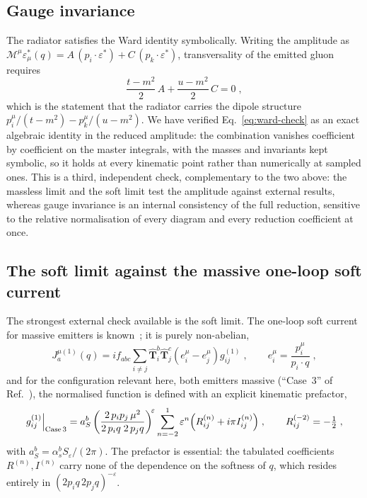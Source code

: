 \documentclass[11pt,a4paper]{article}
\newcommand{\eps}{\varepsilon}
\newcommand{\Top}[1]{\hat{\mathbf{T}}_{#1}}
\begin{document}
\subsection{Gauge invariance}
\label{sec:ward}
The radiator satisfies the Ward identity symbolically. Writing the amplitude as
$\mathcal{M}^\mu\eps^*_\mu(q)=A\,(p_i\!\cdot\!\eps^*)+C\,(p_k\!\cdot\!\eps^*)$,
transversality of the emitted gluon requires
\begin{equation}
  \frac{t-m^2}{2}\,A+\frac{u-m^2}{2}\,C=0\;,
  \label{eq:ward-check}
\end{equation}
which is the statement that the radiator carries the dipole structure
$p_i^\mu/(t-m^2)-p_k^\mu/(u-m^2)$. We have verified Eq.~\eqref{eq:ward-check}
 {as an exact algebraic identity} in the reduced amplitude: the combination
vanishes coefficient by coefficient on the master integrals, with the masses and
invariants kept symbolic, so it holds at every kinematic point rather than
numerically at sampled ones. This is a third, independent check, complementary to
the two above: the massless limit and the soft limit test the amplitude against
external results, whereas gauge invariance is an internal consistency of the full
reduction, sensitive to the relative normalisation of every diagram and every
reduction coefficient at once.

\subsection{The soft limit against the massive one-loop soft current}
\label{sec:bcm}
The strongest external check available is the soft limit. The one-loop soft
current for massive emitters is known~\cite{BCM}; it is purely non-abelian,
\begin{equation}
  J^{\mu(1)}_a(q)=i f_{abc}\sum_{i\neq j}\Top{i}^b\Top{j}^c
    \left(e_i^\mu-e_j^\mu\right)g^{(1)}_{ij}\;,\qquad
  e_i^\mu=\frac{p_i^\mu}{p_i\!\cdot\!q}\;,
  \label{eq:softcurrent}
\end{equation}
and for the configuration relevant here, both emitters massive
(``Case~3'' of Ref.~\cite{BCM}), the normalised function is defined with an
explicit kinematic prefactor,
\begin{equation}
  g^{(1)}_{ij}\Big|_{\rm Case\,3}=a_S^b
  \left(\frac{2\,p_ip_j\,\mu^2}{2\,p_iq\;2\,p_jq}\right)^{\!\eps}
  \sum_{n=-2}^{1}\eps^n\Big(R^{(n)}_{ij}+i\pi I^{(n)}_{ij}\Big)\;,
  \qquad R^{(-2)}_{ij}=-\tfrac12\;,
  \label{eq:gij}
\end{equation}
with $a_S^b=\alpha_s^b S_\eps/(2\pi)$. The prefactor is essential: the tabulated
coefficients $R^{(n)},I^{(n)}$ carry none of the dependence on the softness of
$q$, which resides entirely in $(2p_iq\,2p_jq)^{-\eps}$.
\end{document}
